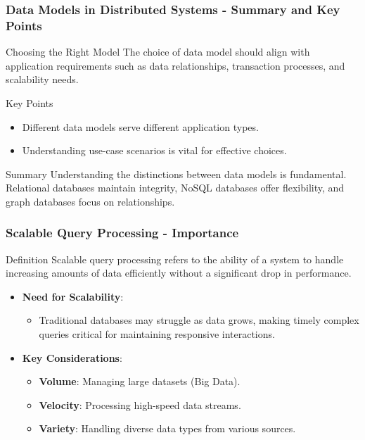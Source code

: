 \documentclass[aspectratio=169]{beamer}
\begin{document}
\begin{frame}[fragile]
    \frametitle{Data Models in Distributed Systems - Summary and Key Points}
    \begin{block}{Choosing the Right Model}
        The choice of data model should align with application requirements such as data relationships, transaction processes, and scalability needs.
    \end{block}
    
    \begin{block}{Key Points}
        \begin{itemize}
            \item Different data models serve different application types.
            \item Understanding use-case scenarios is vital for effective choices.
        \end{itemize}
    \end{block}
    
    \begin{block}{Summary}
        Understanding the distinctions between data models is fundamental. Relational databases maintain integrity, NoSQL databases offer flexibility, and graph databases focus on relationships.
    \end{block}
\end{frame}

\begin{frame}[fragile]
    \frametitle{Scalable Query Processing - Importance}
    \begin{block}{Definition}
        Scalable query processing refers to the ability of a system to handle increasing amounts of data efficiently without a significant drop in performance.
    \end{block}
    
    \begin{itemize}
        \item \textbf{Need for Scalability}: 
              \begin{itemize}
                  \item Traditional databases may struggle as data grows, making timely complex queries critical for maintaining responsive interactions.
              \end{itemize}
        \item \textbf{Key Considerations}:
              \begin{itemize}
                  \item \textbf{Volume}: Managing large datasets (Big Data).
                  \item \textbf{Velocity}: Processing high-speed data streams.
                  \item \textbf{Variety}: Handling diverse data types from various sources.
              \end{itemize}
    \end{itemize}
\end{frame}
\end{document}
